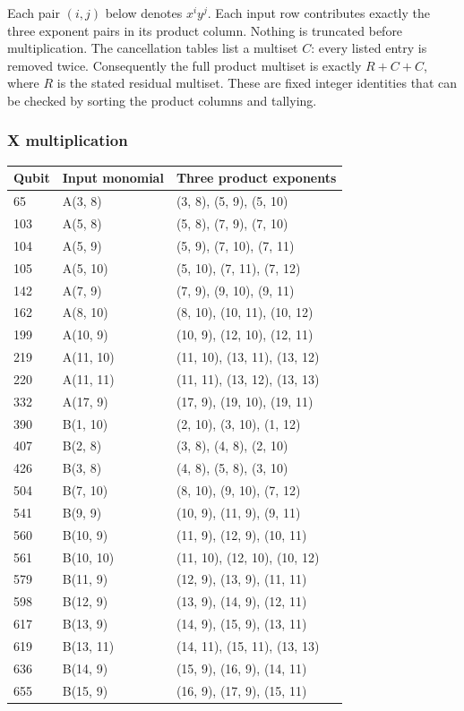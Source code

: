 \documentclass{article}
\begin{document}
Each pair \((i,j)\) below denotes \(x^i y^j\). Each input row contributes exactly the three
exponent pairs in its product column. Nothing is truncated before multiplication. The
cancellation tables list a multiset \(C\): every listed entry is removed twice. Consequently the
full product multiset is exactly \(R + C + C\), where \(R\) is the stated residual multiset. These
are fixed integer identities that can be checked by sorting the product columns and tallying.

\subsubsection{X multiplication}\label{sec:x-multiplication}

\begin{longtable}{lll}
  Qubit & Input monomial & Three product exponents \\
  \hline
  \endhead
  65 & A(3, 8) & (3, 8), (5, 9), (5, 10) \\
  103 & A(5, 8) & (5, 8), (7, 9), (7, 10) \\
  104 & A(5, 9) & (5, 9), (7, 10), (7, 11) \\
  105 & A(5, 10) & (5, 10), (7, 11), (7, 12) \\
  142 & A(7, 9) & (7, 9), (9, 10), (9, 11) \\
  162 & A(8, 10) & (8, 10), (10, 11), (10, 12) \\
  199 & A(10, 9) & (10, 9), (12, 10), (12, 11) \\
  219 & A(11, 10) & (11, 10), (13, 11), (13, 12) \\
  220 & A(11, 11) & (11, 11), (13, 12), (13, 13) \\
  332 & A(17, 9) & (17, 9), (19, 10), (19, 11) \\
  390 & B(1, 10) & (2, 10), (3, 10), (1, 12) \\
  407 & B(2, 8) & (3, 8), (4, 8), (2, 10) \\
  426 & B(3, 8) & (4, 8), (5, 8), (3, 10) \\
  504 & B(7, 10) & (8, 10), (9, 10), (7, 12) \\
  541 & B(9, 9) & (10, 9), (11, 9), (9, 11) \\
  560 & B(10, 9) & (11, 9), (12, 9), (10, 11) \\
  561 & B(10, 10) & (11, 10), (12, 10), (10, 12) \\
  579 & B(11, 9) & (12, 9), (13, 9), (11, 11) \\
  598 & B(12, 9) & (13, 9), (14, 9), (12, 11) \\
  617 & B(13, 9) & (14, 9), (15, 9), (13, 11) \\
  619 & B(13, 11) & (14, 11), (15, 11), (13, 13) \\
  636 & B(14, 9) & (15, 9), (16, 9), (14, 11) \\
  655 & B(15, 9) & (16, 9), (17, 9), (15, 11) \\
\end{longtable}
\end{document}
